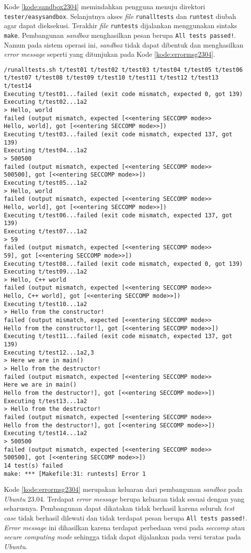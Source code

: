Kode \ref{kode:sandbox2304} memindahkan pengguna menuju direktori \texttt{tester/easysandbox}. Selanjutnya akses \textit{file} \texttt{runalltests} dan \texttt{runtest} diubah agar dapat dieksekusi. Terakhir \textit{file} \texttt{runtests} dijalankan menggunakan sintaks \texttt{make}. Pembangunan \textit{sandbox} menghasilkan pesan berupa \texttt{All tests passed!}. Namun pada sistem operasi ini, \textit{sandbox} tidak dapat dibentuk dan menghasilkan \textit{error message} seperti yang ditunjukan pada Kode \ref{kode:errormsg2304}.
\begin{lstlisting}[caption=\textit{Error message} pembangunan \textit{sandbox} pada \textit{Ubuntu} 23.04, label=kode:errormsg2304]
/runalltests.sh t/test01 t/test02 t/test03 t/test04 t/test05 t/test06 t/test07 t/test08 t/test09 t/test10 t/test11 t/test12 t/test13 t/test14
Executing t/test01...failed (exit code mismatch, expected 0, got 139)
Executing t/test02...1a2
> Hello, world
failed (output mismatch, expected [<<entering SECCOMP mode>>
Hello, world], got [<<entering SECCOMP mode>>])
Executing t/test03...failed (exit code mismatch, expected 137, got 139)
Executing t/test04...1a2
> 500500
failed (output mismatch, expected [<<entering SECCOMP mode>>
500500], got [<<entering SECCOMP mode>>])
Executing t/test05...1a2
> Hello, world
failed (output mismatch, expected [<<entering SECCOMP mode>>
Hello, world], got [<<entering SECCOMP mode>>])
Executing t/test06...failed (exit code mismatch, expected 137, got 139)
Executing t/test07...1a2
> 59
failed (output mismatch, expected [<<entering SECCOMP mode>>
59], got [<<entering SECCOMP mode>>])
Executing t/test08...failed (exit code mismatch, expected 0, got 139)
Executing t/test09...1a2
> Hello, C++ world
failed (output mismatch, expected [<<entering SECCOMP mode>>
Hello, C++ world], got [<<entering SECCOMP mode>>])
Executing t/test10...1a2
> Hello from the constructor!
failed (output mismatch, expected [<<entering SECCOMP mode>>
Hello from the constructor!], got [<<entering SECCOMP mode>>])
Executing t/test11...failed (exit code mismatch, expected 137, got 139)
Executing t/test12...1a2,3
> Here we are in main()
> Hello from the destructor!
failed (output mismatch, expected [<<entering SECCOMP mode>>
Here we are in main()
Hello from the destructor!], got [<<entering SECCOMP mode>>])
Executing t/test13...1a2
> Hello from the destructor!
failed (output mismatch, expected [<<entering SECCOMP mode>>
Hello from the destructor!], got [<<entering SECCOMP mode>>])
Executing t/test14...1a2
> 500500
failed (output mismatch, expected [<<entering SECCOMP mode>>
500500], got [<<entering SECCOMP mode>>])
14 test(s) failed
make: *** [Makefile:31: runtests] Error 1
\end{lstlisting}
Kode \ref{kode:errormsg2304} merupakan keluaran dari pembangunan \textit{sandbox} pada \textit{Ubuntu} 23.04. Terdapat \textit{error message} berupa keluaran tidak sesuai dengan yang seharusnya. Pembangunan dapat dikatakan tidak berhasil karena seluruh \textit{test case} tidak berhasil dilewati dan tidak terdapat pesan berupa \texttt{All tests passed!}. \textit{Error message} ini dihasilkan karena terdapat perbedaan versi pada \textit{seccomp} atau \textit{secure computing mode} sehingga tidak dapat dijalankan pada versi teratas pada \textit{Ubuntu}.

